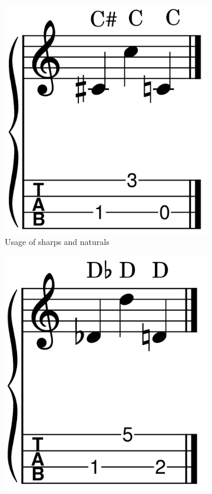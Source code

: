 \begin{figure}[h]
	\begin{subfigure}[b]{0.45\textwidth}
		\centering
		\includegraphics[height=0.12\textheight]{../../MuseScore/Ukulele/UkuleleSharpApplyExample.png}
		\caption{Usage of sharps and naturals}
		\label{fig:ukulele_usage_of_sharps_and_naturals}
	\end{subfigure}
	\hfill
	\begin{subfigure}[b]{0.45\textwidth}
		\centering
		\includegraphics[height=0.12\textheight]{../../MuseScore/Ukulele/UkuleleFlatApplyExample.png}

\end{subfigure}
\end{figure}
